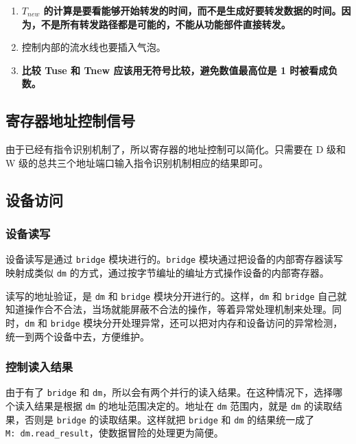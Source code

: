 \documentclass[12pt,AutoFakeBold,AutoFakeSlant]{article}
\providecommand{\tightlist}{%
  \setlength{\itemsep}{0pt}\setlength{\parskip}{0pt}}
\newcommand{\ms}[1]{\texttt{#1}}
\begin{document}
\begin{enumerate}
\tightlist
\item
\textbf{$ T_{new} $
的计算是要看能够开始转发的时间，而不是生成好要转发数据的时间。因为，不是所有转发路径都是可能的，不能从功能部件直接转发。}
\item
控制内部的流水线也要插入气泡。
\item
\textbf{比较 Tuse 和 Tnew 应该用无符号比较，避免数值最高位是 1 时被看成负数。}
\end{enumerate}

\hypertarget{ux5bc4ux5b58ux5668ux5730ux5740ux63a7ux5236ux4fe1ux53f7}{%
\subsection{寄存器地址控制信号}\label{ux5bc4ux5b58ux5668ux5730ux5740ux63a7ux5236ux4fe1ux53f7}}

由于已经有指令识别机制了，所以寄存器的地址控制可以简化。只需要在 D 级和 W 级的总共三个地址端口输入指令识别机制相应的结果即可。

\hypertarget{ux8bbeux5907ux8bbfux95ee}{%
\subsection{设备访问}\label{ux8bbeux5907ux8bbfux95ee}}

\hypertarget{ux8bbeux5907ux8bfbux5199}{%
\subsubsection{设备读写}\label{ux8bbeux5907ux8bfbux5199}}

设备读写是通过 \texttt{bridge} 模块进行的。\texttt{bridge} 模块通过把设备的内部寄存器读写映射成类似 \texttt{dm} 的方式，通过按字节编址的编址方式操作设备的内部寄存器。

读写的地址验证，是 \ms{dm} 和 \ms{bridge} 模块分开进行的。这样，\ms{dm} 和 \ms{bridge} 自己就知道操作合不合法，当场就能屏蔽不合法的操作，等着异常处理机制来处理。同时，\ms{dm} 和 \ms{bridge} 模块分开处理异常，还可以把对内存和设备访问的异常检测，统一到两个设备中去，方便维护。

\hypertarget{ux63a7ux5236ux8bfbux5165ux7ed3ux679c}{%
\subsubsection{控制读入结果}\label{ux63a7ux5236ux8bfbux5165ux7ed3ux679c}}

由于有了 \texttt{bridge} 和 \texttt{dm}，所以会有两个并行的读入结果。在这种情况下，选择哪个读入结果是根据 \ms{dm} 的地址范围决定的。地址在 \ms{dm} 范围内，就是 \ms{dm} 的读取结果，否则是 \ms{bridge} 的读取结果。这样就把 \texttt{bridge} 和 \texttt{dm} 的结果统一成了 \texttt{M:\ dm.read\_result}，使数据冒险的处理更为简便。 
\end{document}
